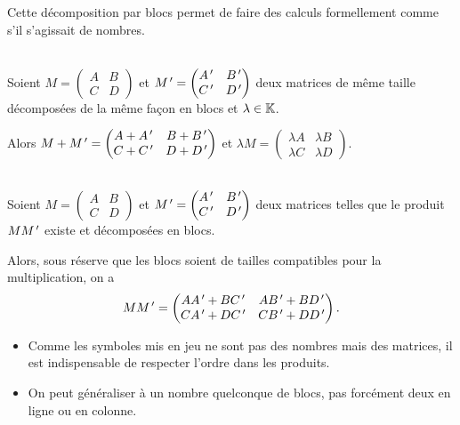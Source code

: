 Cette décomposition par blocs permet de faire des calculs formellement comme s'il s'agissait de nombres.

\begin{prop}~\\
Soient \(M=\begin{pmatrix}
A & B \\
C & D
\end{pmatrix}\) et \(M^{\,\prime}=\begin{pmatrix}
A^{\,\prime} & B^{\,\prime} \\
C^{\,\prime} & D^{\,\prime}
\end{pmatrix}\) deux matrices de même taille décomposées de la même façon en blocs et \(\lambda\in\mathbb{K}\).

Alors \(M+M^{\,\prime}=\begin{pmatrix}
A+A^{\,\prime} & B+B^{\,\prime} \\
C+C^{\,\prime} & D+D^{\,\prime}
\end{pmatrix}\) et \(\lambda M=\begin{pmatrix}
\lambda A & \lambda B \\
\lambda C & \lambda D
\end{pmatrix}\).
\end{prop}

\begin{prop}~\\
Soient \(M=\begin{pmatrix}
A & B \\
C & D
\end{pmatrix}\) et \(M^{\,\prime}=\begin{pmatrix}
A^{\,\prime} & B^{\,\prime} \\
C^{\,\prime} & D^{\,\prime}
\end{pmatrix}\) deux matrices telles que le produit \(MM^{\,\prime}\) existe et décomposées en blocs.

Alors, sous réserve que les blocs soient de tailles compatibles pour la multiplication, on a \[MM^{\,\prime}=\begin{pmatrix}
AA^{\,\prime}+BC^{\,\prime} & AB^{\,\prime}+BD^{\,\prime} \\
CA^{\,\prime}+DC^{\,\prime} & CB^{\,\prime}+DD^{\,\prime}
\end{pmatrix}.\]
\end{prop}

\begin{rem}
\begin{itemize}
    \item Comme les symboles mis en jeu ne sont pas des nombres mais des matrices, il est indispensable de respecter l'ordre dans les produits. \\
    \item On peut généraliser à un nombre quelconque de blocs, pas forcément deux en ligne ou en colonne.
\end{itemize}
\end{rem}

